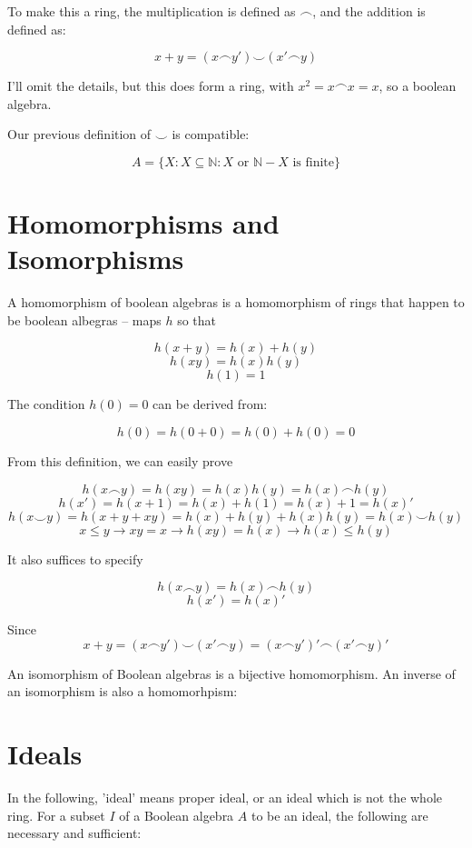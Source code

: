 \documentclass{article}
\begin{document}
    To make this a ring, the multiplication is defined as $\frown$, and the
    addition is defined as:

    \[ x + y = (x \frown y') \smile (x' \frown y)\]

    I'll omit the details, but this does form a ring, with $x^2 = x \frown x =
    x$, so a boolean algebra.

    Our previous definition of $\smile$ is compatible:


    \[A = \{X: X \subseteq \mathbb{N}: X \text{ or } \mathbb{N} - X \text{ is
    finite} \} \]

    \section{Homomorphisms and Isomorphisms}

    A homomorphism of boolean algebras is a homomorphism of rings that happen to
    be boolean albegras -- maps $h$ so that

    \[h(x+y) = h(x) + h(y)\]
    \[h(xy) = h(x)h(y)\]
    \[h(1) = 1\]

    The condition $h(0)= 0$ can be derived from:

    \[h(0) = h(0+0) = h(0)+h(0) = 0\]

    From this definition, we can easily prove

    \[h(x \frown y) = h(xy) = h(x)h(y) = h(x) \frown h(y)\]
    \[h(x') = h(x+1) = h(x) + h(1) = h(x) + 1 = h(x)'\]
    \[h(x \smile y) = h(x + y + xy) = h(x) + h(y) + h(x)h(y) = h(x) \smile
    h(y)\]
    \[x \leq y \rightarrow xy = x \rightarrow h(xy) = h(x) \rightarrow h(x) \leq
    h(y)\]

    It also suffices to specify

    \[ h(x \frown y) = h(x) \frown h(y) \]
    \[h(x') = h(x)'\]

    Since
    \[x + y = (x \frown y') \smile (x' \frown y) = (x \frown y')' \frown (x'
    \frown y)'\]

    An isomorphism of Boolean algebras is a bijective homomorphism. An inverse
    of an isomorphism is also a homomorhpism:




    \section{Ideals}

      In the following, 'ideal' means proper ideal, or an ideal which is not the
      whole ring. For a subset $I$ of a Boolean algebra $A$ to be an ideal, the
      following are necessary and sufficient:
\end{document}
